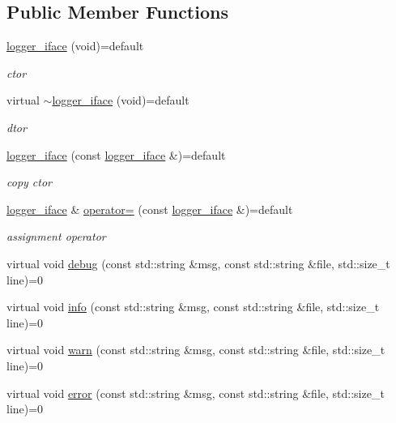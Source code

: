 \subsection*{Public Member Functions}
\begin{DoxyCompactItemize}
\item 
\hyperlink{classtacopie_1_1logger__iface_afccf838f815d168e82e4722e2c4d0d90}{logger\+\_\+iface} (void)=default
\begin{DoxyCompactList}\small\item\em ctor \end{DoxyCompactList}\item 
virtual \hyperlink{classtacopie_1_1logger__iface_a562dcc605198ca90904ba21fa98eb6ea}{$\sim$logger\+\_\+iface} (void)=default
\begin{DoxyCompactList}\small\item\em dtor \end{DoxyCompactList}\item 
\hyperlink{classtacopie_1_1logger__iface_a34fb7873b2c5e908afd2d4a0d4965ec1}{logger\+\_\+iface} (const \hyperlink{classtacopie_1_1logger__iface}{logger\+\_\+iface} \&)=default
\begin{DoxyCompactList}\small\item\em copy ctor \end{DoxyCompactList}\item 
\hyperlink{classtacopie_1_1logger__iface}{logger\+\_\+iface} \& \hyperlink{classtacopie_1_1logger__iface_ac3ca89b7c5d227b8ed3a5adaa5b72527}{operator=} (const \hyperlink{classtacopie_1_1logger__iface}{logger\+\_\+iface} \&)=default
\begin{DoxyCompactList}\small\item\em assignment operator \end{DoxyCompactList}\item 
virtual void \hyperlink{classtacopie_1_1logger__iface_a156abb02ab852ea4033fc13f4902ee7a}{debug} (const std\+::string \&msg, const std\+::string \&file, std\+::size\+\_\+t line)=0
\item 
virtual void \hyperlink{classtacopie_1_1logger__iface_af176525bca036944f75bad6469860929}{info} (const std\+::string \&msg, const std\+::string \&file, std\+::size\+\_\+t line)=0
\item 
virtual void \hyperlink{classtacopie_1_1logger__iface_ab96d8f6bc2e2b514c7ceec4c856f8921}{warn} (const std\+::string \&msg, const std\+::string \&file, std\+::size\+\_\+t line)=0
\item 
virtual void \hyperlink{classtacopie_1_1logger__iface_a18f9c02fc19be4b9900ac9fb1a361624}{error} (const std\+::string \&msg, const std\+::string \&file, std\+::size\+\_\+t line)=0
\end{DoxyCompactItemize}


